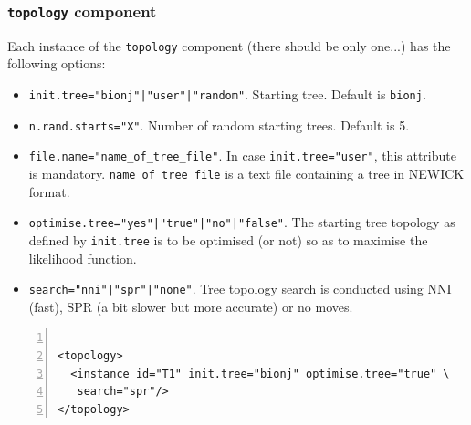 \documentclass[a4paper,12pt]{article}
\newcommand{\x}[1]{\texttt{#1}}
\begin{document}
\subsubsection{{\tt topology} component}
Each instance of the \x{topology} component (there should be only one...) has the following options:
\begin{itemize}
\item \x{init.tree="bionj"|"user"|"random"}.  Starting tree. Default is \x{bionj}.
\item \x{n.rand.starts="X"}.  Number of random starting trees. Default is 5.
\item \x{file.name="name\_of\_tree\_file"}. In case \x{init.tree="user"}, this
  attribute  is mandatory. \x{name\_of\_tree\_file} is a
  text file containing a tree in NEWICK format.
\item \x{optimise.tree="yes"|"true"|"no"|"false"}. The starting tree topology as defined by
  \x{init.tree} is to be optimised (or not) so as to maximise the likelihood function.
\item \x{search="nni"|"spr"|"none"}. Tree topology search is conducted using NNI (fast), SPR (a bit
  slower but more accurate) or no moves.
\end{itemize}
\vspace{0.2cm}
\begin{Verbatim}[frame=single, label=Example of `topology' component, samepage=true,
  baselinestretch=0.5, fontsize=\small, numbers=left]

<topology>
  <instance id="T1" init.tree="bionj" optimise.tree="true" \
   search="spr"/>
</topology>

\end{Verbatim}
\end{document}
